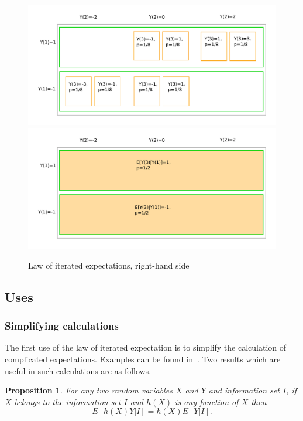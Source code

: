 \documentclass[11pt,reqno,openany]{amsbook}
\theoremstyle{plain}
\newtheorem{prop}{Proposition}[chapter]
\theoremstyle{definition}
\begin{document}
\begin{figure}
\includegraphics[width=\textwidth]{iter_expect/lier1.pdf}\\
\includegraphics[width=\textwidth]{iter_expect/lier2.pdf}
\caption{Law of iterated expectations, right-hand side}\label{fig:lie-rhs}
\end{figure}

\subsection{Uses}
\subsubsection{Simplifying calculations}
The first use of the law of iterated expectation is to simplify the
calculation of complicated expectations. Examples can be found
in~\cite{ross-probability}. Two results which are useful
in such calculations are as follows.

\begin{prop}\label{prop:conex-funx}
  For any two random variables $X$ and $Y$ and information set $I$, if
  $X$ belongs to the information set $I$ and $h(X)$ is any function of
  $X$ then
  \[E[h(X)Y|I]=h(X)E[Y|I].\]
\end{prop}
\end{document}
